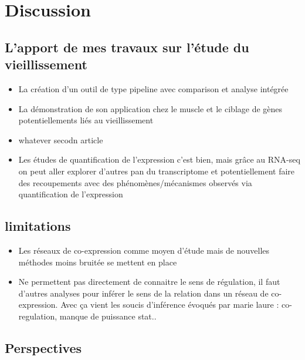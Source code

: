 \setcounter{chapter}{5}
\setcounter{section}{0}
\setcounter{figure}{0}   
\chapter*{Discussion}         %

\section{L'apport de mes travaux sur l'étude du vieillissement}

\begin{itemize}
    \item La création d'un outil de type pipeline avec comparison et analyse intégrée
    \item La démonstration de son application chez le muscle et le ciblage de gènes potentiellements liés au vieillissement
    \item whatever secodn article
    \item Les études de quantification de l'expression c'est bien, mais grâce au RNA-seq on peut aller explorer d'autres pan du transcriptome et potentiellement faire des recoupements avec des phénomènes/mécanismes observés via quantification de l'expression
\end{itemize}

\section{limitations}
\begin{itemize}
    \item Les réseaux de co-expression comme moyen d'étude mais de nouvelles méthodes moins bruitée se mettent en place %
    \item Ne permettent pas directement de connaitre le sens de régulation, il faut d'autres analyses pour inférer le sens de la relation dans un réseau de co-expression. Avec ça vient les soucis d'inférence évoqués par marie laure : co-regulation, manque de puissance stat..
\end{itemize}



\section{Perspectives}

